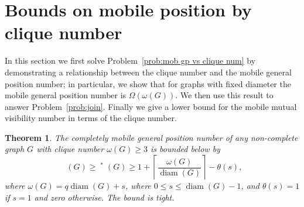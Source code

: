 \documentclass[a4paper,12pt]{article}
\DeclareMathOperator{\mob}{Mob_{gp}}
\DeclareMathOperator{\diam}{diam}
\newtheorem{theorem}{Theorem}[section]
\theoremstyle{definition}
\begin{document}
	\section{Bounds on mobile position by clique number}\label{sec:clique number}
	
	In this section we first solve Problem~\ref{prob:mob gp vs clique num} by demonstrating a relationship between the clique number and the mobile general position number; in particular, we show that for graphs with fixed diameter the mobile general position number is $\Omega (\omega (G))$. We then use this result to answer Problem~\ref{prob:join}. Finally we give a lower bound for the mobile mutual visibility number in terms of the clique number.
	
	\begin{theorem}\label{thm:mobgp vs clique number} The completely mobile general position number of any non-complete graph $G$ with clique number $\omega(G) \geq 3$ is bounded below by 
		\[ \mob (G) \geq \mob ^*(G) \geq 1+\left \lceil \frac{\omega (G)}{\diam (G)} \right \rceil -\theta (s),\] where $\omega (G) = q\diam (G)+s$, where $0 \leq s \leq \diam (G)-1$, and $\theta (s) = 1$ if $s = 1$ and zero otherwise. The bound is tight.
	\end{theorem}
\end{document}
